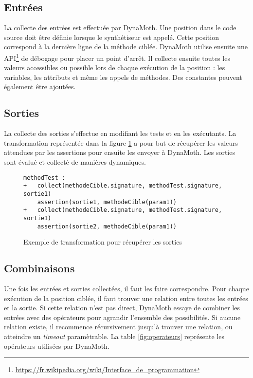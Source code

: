 \subsection{Entrées}
\label{subsec:collecte_entree}
\par La collecte des entrées est effectuée par DynaMoth. Une position dans le code source doit être définie lorsque le synthétiseur est appelé. Cette position correspond à la dernière ligne de la méthode ciblée. DynaMoth utilise ensuite une API\footnote{\url{https://fr.wikipedia.org/wiki/Interface_de_programmation}} de débogage pour placer un point d'arrêt. Il collecte ensuite toutes les valeurs accessibles ou possible lors de chaque exécution de la position : les variables, les attributs et même les appels de méthodes. Des constantes peuvent également être ajoutées.

\subsection{Sorties}
\label{subsec:collecte_sorties}
\par La collecte des sorties s'effectue en modifiant les tests et en les exécutants. La transformation représentée dans la figure \ref{fig:collect_sorties} a pour but de récupérer les valeurs attendues par les assertions pour ensuite les envoyer à DynaMoth. Les sorties sont évalué et collecté de manières dynamiques.

\begin{figure}[H]
\begin{lstlisting}
methodTest :
+   collect(methodeCible.signature, methodTest.signature, sortie1)
    assertion(sortie1, methodeCible(param1))
+   collect(methodeCible.signature, methodTest.signature, sortie1)
    assertion(sortie2, methodeCible(param1))
\end{lstlisting}
\caption{Exemple de transformation pour récupérer les sorties}
\label{fig:collect_sorties}
\end{figure}

\subsection{Combinaisons}
\label{subsec:combinaisons}

\par Une fois les entrées et sorties collectées, il faut les faire correspondre. Pour chaque exécution de la position ciblée, il faut trouver une relation entre toutes les entrées et la sortie. Si cette relation n'est pas direct, DynaMoth essaye de combiner les entrées avec des opérateurs pour agrandir l'ensemble des possibilités. Si aucune relation existe, il recommence récursivement jusqu'à trouver une relation, ou atteindre un \textit{timeout} paramètrable. La table \ref{fig:operateurs} représente les opérateurs utilisées par DynaMoth.

